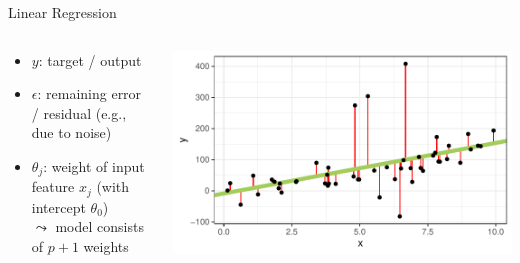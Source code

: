 \documentclass[11pt,compress,t,notes=noshow, aspectratio=169, xcolor=table]{beamer}
\begin{document}
\begin{frame}[c]{Linear Regression}
\begin{columns}[T, totalwidth = \linewidth]
\begin{column}{0.58\linewidth}
 \begin{itemize}
        \item $y$: target / output
        \item $\epsilon$: remaining error / residual (e.g., due to noise)
        \item $\theta_j$: weight of input feature $x_j$ (with intercept $\theta_0$)\\
        $\leadsto$ model consists of $p+1$ weights
    \end{itemize}
\end{column}
\begin{column}{0.42\linewidth}
\includegraphics[width=\linewidth]{figure/lm_example.pdf}
\end{column}
\end{columns}
   

\end{frame}
\end{document}
